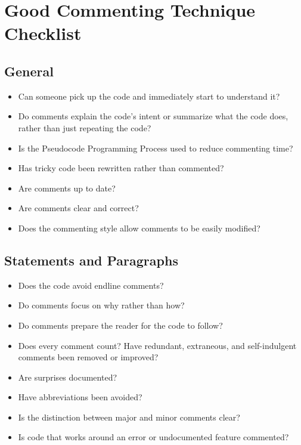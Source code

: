 \newpage
\section{Good Commenting Technique Checklist}
\subsection{General}
\begin{itemize}
\item Can someone pick up the code and immediately start to understand it?
\item Do comments explain the code’s intent or summarize what the code does, rather than just repeating the code?
\item Is the Pseudocode Programming Process used to reduce commenting time?
\item Has tricky code been rewritten rather than commented?
\item Are comments up to date?
\item Are comments clear and correct?
\item Does the commenting style allow comments to be easily modified?
\end{itemize}
\subsection{Statements and Paragraphs}
\begin{itemize}
\item Does the code avoid endline comments?
\item Do comments focus on why rather than how?
\item Do comments prepare the reader for the code to follow?
\item Does every comment count? Have redundant, extraneous, and self-indulgent comments been removed or improved?
\item Are surprises documented?
\item Have abbreviations been avoided?
\item Is the distinction between major and minor comments clear?
\item Is code that works around an error or undocumented feature commented?
\end{itemize}

